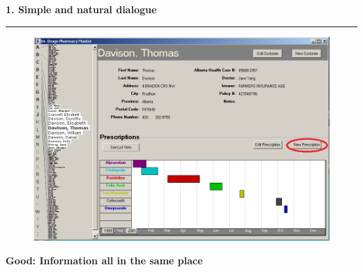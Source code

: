 \documentclass[pdf]{beamer}
\begin{document}
\begin{frame}
{\textbf{1. Simple and natural dialogue}}{\textcolor{red}{\rule{12cm}{1.2pt}}}

	\begin{figure}[b]
      \includegraphics[scale = 0.47]{10_Picture1.png}
  	\end{figure}

    \hspace{150px}\fontsize{7pt}{10pt}\textbf{Good: Information all in the same place}
   
 	\fontsize{4pt}{0.5pt}
\end{frame}
\end{document}
